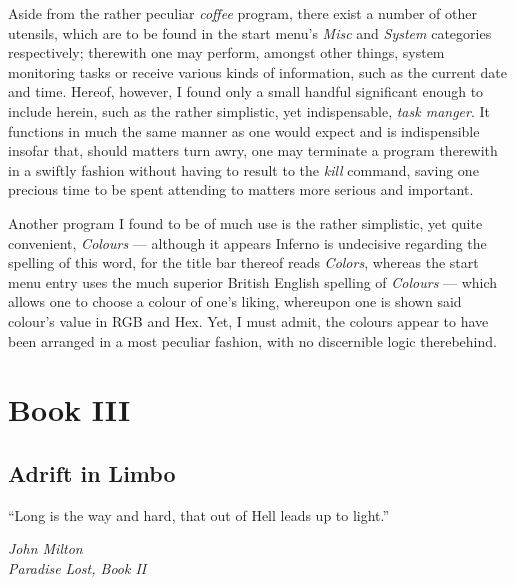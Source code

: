\documentclass[a5paper,twoside,12pt]{report}
\begin{document}
  Aside from the rather peculiar \textit{coffee} program, there exist a number of other utensils, which are to be found in the start menu's \textit{Misc} and \textit{System} categories respectively; therewith one may perform, amongst other things, system monitoring tasks or receive various kinds of information, such as the current date and time. Hereof, however, I found only a small handful significant enough to include herein, such as the rather simplistic, yet indispensable, \textit{task manger}. It functions in much the same manner as one would expect and is indispensible insofar that, should matters turn awry, one may terminate a program therewith in a swiftly fashion without having to result to the \textit{kill} command, saving one precious time to be spent attending to matters more serious and important.
  
  Another program I found to be of much use is the rather simplistic, yet quite convenient, \textit{Colours} — although it appears Inferno is undecisive regarding the spelling of this word, for the title bar thereof reads \textit{Colors}, whereas the start menu entry uses the much superior British English spelling of \textit{Colours} — which allows one to choose a colour of one's liking, whereupon one is shown said colour's value in RGB and Hex. Yet, I must admit, the colours appear to have been arranged in a most peculiar fashion, with no discernible logic therebehind.
  
\part*{Book III}
  \newpage

\thispagestyle{empty}
  \mbox{}
  \newpage

\chapter*{Adrift in Limbo}

\epigraph{``Long is the way and hard, that out of Hell leads up to light.''}{\textit{John Milton\\Paradise Lost, Book II}}
\end{document}
